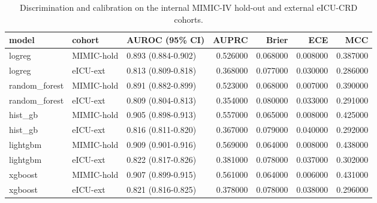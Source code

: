 \begin{table}
\caption{Discrimination and calibration on the internal MIMIC-IV hold-out and external eICU-CRD cohorts.}
\label{tab:performance}
\begin{tabular}{lllrrrr}
\toprule
model & cohort & AUROC (95\% CI) & AUPRC & Brier & ECE & MCC \\
\midrule
logreg & MIMIC-hold & 0.893 (0.884-0.902) & 0.526000 & 0.068000 & 0.008000 & 0.387000 \\
logreg & eICU-ext & 0.813 (0.809-0.818) & 0.368000 & 0.077000 & 0.030000 & 0.286000 \\
random\_forest & MIMIC-hold & 0.891 (0.882-0.899) & 0.523000 & 0.068000 & 0.007000 & 0.390000 \\
random\_forest & eICU-ext & 0.809 (0.804-0.813) & 0.354000 & 0.080000 & 0.033000 & 0.291000 \\
hist\_gb & MIMIC-hold & 0.905 (0.898-0.913) & 0.557000 & 0.065000 & 0.008000 & 0.425000 \\
hist\_gb & eICU-ext & 0.816 (0.811-0.820) & 0.367000 & 0.079000 & 0.040000 & 0.292000 \\
lightgbm & MIMIC-hold & 0.909 (0.901-0.916) & 0.569000 & 0.064000 & 0.008000 & 0.438000 \\
lightgbm & eICU-ext & 0.822 (0.817-0.826) & 0.381000 & 0.078000 & 0.037000 & 0.302000 \\
xgboost & MIMIC-hold & 0.907 (0.899-0.915) & 0.561000 & 0.064000 & 0.006000 & 0.431000 \\
xgboost & eICU-ext & 0.821 (0.816-0.825) & 0.378000 & 0.078000 & 0.038000 & 0.296000 \\
\bottomrule
\end{tabular}
\end{table}
